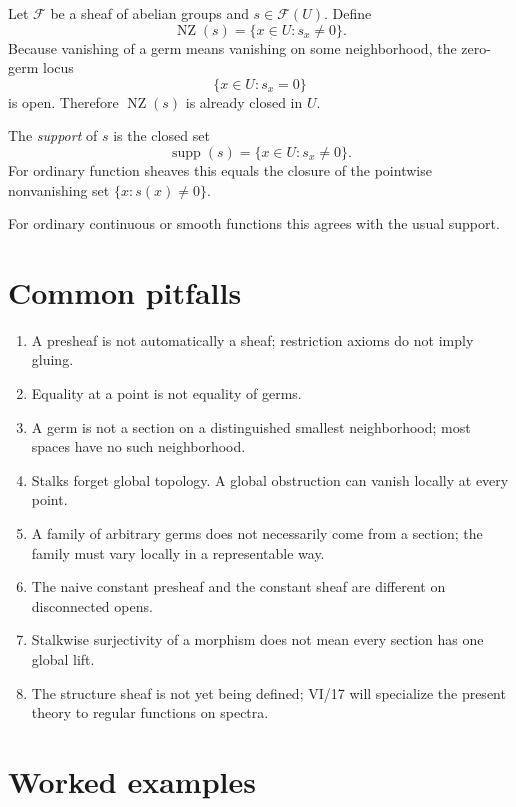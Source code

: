 Let $\mathcal F$ be a sheaf of abelian groups and $s\in\mathcal F(U)$.  Define
\[
\operatorname{NZ}(s)=\{x\in U:s_x\neq0\}.
\]
Because vanishing of a germ means vanishing on some neighborhood, the zero-germ locus
\[
\{x\in U:s_x=0\}
\]
is open.  Therefore $\operatorname{NZ}(s)$ is already closed in $U$.

\begin{definition}[Support]
The \emph{support} of $s$ is the closed set
\[
\operatorname{supp}(s)=\{x\in U:s_x\neq0\}.
\]
For ordinary function sheaves this equals the closure of the pointwise nonvanishing set
$\{x:s(x)\neq0\}$.
\end{definition}



For ordinary continuous or smooth functions this agrees with the usual support.

\section{Common pitfalls}

\begin{enumerate}
\item A presheaf is not automatically a sheaf; restriction axioms do not imply gluing.
\item Equality at a point is not equality of germs.
\item A germ is not a section on a distinguished smallest neighborhood; most spaces have no
such neighborhood.
\item Stalks forget global topology.  A global obstruction can vanish locally at every point.
\item A family of arbitrary germs does not necessarily come from a section; the family must
vary locally in a representable way.
\item The naive constant presheaf and the constant sheaf are different on disconnected opens.
\item Stalkwise surjectivity of a morphism does not mean every section has one global lift.
\item The structure sheaf is not yet being defined; VI/17 will specialize the present theory
to regular functions on spectra.
\end{enumerate}

\section{Worked examples}


